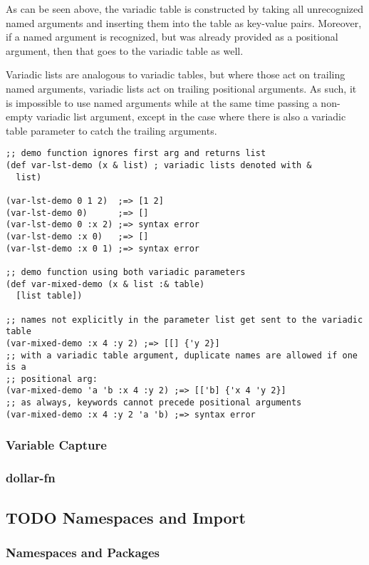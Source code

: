 \documentclass[11pt]{article}
\begin{document}
As can be seen above, the variadic table is constructed by taking all
unrecognized named arguments and inserting them into the table as key-value
pairs. Moreover, if a named argument is recognized, but was already provided as
a positional argument, then that goes to the variadic table as well.

Variadic lists are analogous to variadic tables, but where those act on trailing
named arguments, variadic lists act on trailing positional arguments. As such,
it is impossible to use named arguments while at the same time passing a
non-empty variadic list argument, except in the case where there is also a
variadic table parameter to catch the trailing arguments.
\begin{verbatim}
;; demo function ignores first arg and returns list
(def var-lst-demo (x & list) ; variadic lists denoted with &
  list)

(var-lst-demo 0 1 2)  ;=> [1 2]
(var-lst-demo 0)      ;=> []
(var-lst-demo 0 :x 2) ;=> syntax error
(var-lst-demo :x 0)   ;=> []
(var-lst-demo :x 0 1) ;=> syntax error

;; demo function using both variadic parameters
(def var-mixed-demo (x & list :& table)
  [list table])

;; names not explicitly in the parameter list get sent to the variadic table
(var-mixed-demo :x 4 :y 2) ;=> [[] {'y 2}]
;; with a variadic table argument, duplicate names are allowed if one is a 
;; positional arg:
(var-mixed-demo 'a 'b :x 4 :y 2) ;=> [['b] {'x 4 'y 2}]
;; as always, keywords cannot precede positional arguments
(var-mixed-demo :x 4 :y 2 'a 'b) ;=> syntax error
\end{verbatim}


\subsubsection{Variable Capture}
\label{sec:org9945995}


\subsubsection{dollar-fn}
\label{sec:org975cdcb}

\subsection{{\bfseries\sffamily TODO} Namespaces and Import}
\label{sec:org4b0fe4d}

\subsubsection{Namespaces and Packages}
\label{sec:orgdeda7f2}
\end{document}
